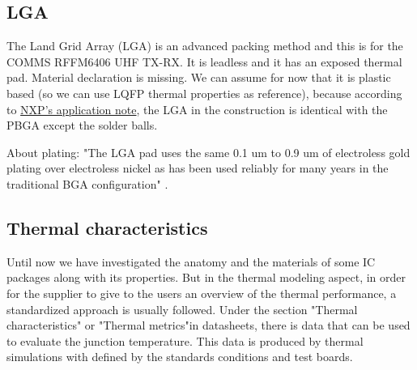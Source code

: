 \documentclass[final]{cubedoc}
\begin{document}
	\subsection{LGA}
	
	The Land Grid Array (LGA) is an advanced packing method and this is for the COMMS RFFM6406 UHF TX-RX. It is leadless and it has an exposed thermal pad. Material declaration is missing. We can assume for now that it is plastic based (so we can use LQFP thermal properties as reference), because according to \href{https://web.archive.org/web/20200818134018/https://www.nxp.com/docs/en/application-note/AN2265.pdf}{NXP's application note}, the LGA in the construction is identical with the PBGA except the solder balls. 
	
	About plating: "The LGA pad uses the same 0.1 um to 0.9 um of electroless gold plating over electroless nickel as has been used reliably for many years in the traditional BGA configuration" \cite{nxpplating}.
	
	
	\subsection{Thermal characteristics}
	
	
	Until now we have investigated the anatomy and the materials of some IC packages along with its properties. But in the thermal modeling aspect, in order for the supplier to give to the users an overview of the thermal performance, a standardized approach is usually followed. Under the section "Thermal characteristics" or "Thermal metrics"in datasheets,  there is data that can be used to evaluate the junction temperature. This data is produced by thermal simulations with defined by the standards conditions and test boards.
	
\end{document}
